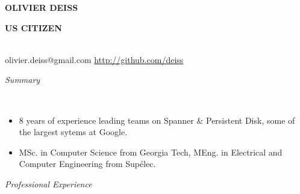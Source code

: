 \documentclass[a4paper, 12pt]{article}
\newcommand{\marginline}{-0.3cm}
\newcommand{\margincontentnotextbefore}{-0.3cm}
\newcommand{\marginbeforesection}{0.35cm}
\newcommand{\linewidthperso}{0.02cm}
\newcommand{\stylesection}[1]{
  \vspace{\marginbeforesection}
  \begin{normalsize}\textit{#1}\end{normalsize}
  \vspace{\marginline}\\
  \noindent\makebox[\linewidth]{\rule{\textwidth}{\linewidthperso}}

}
\begin{document}
\begin{footnotesize}

\begin{center}
  \begin{small}\textbf{OLIVIER DEISS}\end{small} \textbullet \:\begin{small}\textbf{US CITIZEN}\end{small}\\
  olivier.deiss@gmail.com \textbullet \:\url{http://github.com/deiss}\\
\end{center}

\stylesection{Summary}

\vspace{\margincontentnotextbefore}
\begin{itemize}
  \item 8 years of experience leading teams on Spanner \& Persistent Disk, some of the largest sytems at Google.
  \item MSc. in Computer Science from Georgia Tech, MEng. in Electrical and Computer Engineering from Sup\'elec.
\end{itemize}

\stylesection{Professional Experience}


\end{footnotesize}
\end{document}
